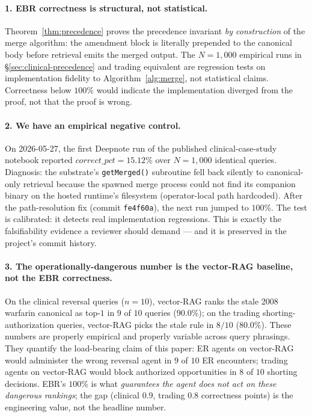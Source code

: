 \documentclass[runningheads]{llncs}
\begin{document}
\paragraph{1. EBR correctness is structural, not statistical.} Theorem~\ref{thm:precedence}
proves the precedence invariant \emph{by construction} of the merge
algorithm: the amendment block is literally prepended to the canonical
body before retrieval emits the merged output. The $N{=}1{,}000$ empirical
runs in \S\ref{sec:clinical-precedence} and trading equivalent are
regression tests on implementation fidelity to Algorithm~\ref{alg:merge},
not statistical claims. Correctness below $100\%$ would indicate the
implementation diverged from the proof, not that the proof is wrong.

\paragraph{2. We have an empirical negative control.} On 2026-05-27, the
first Deepnote run of the published clinical-case-study notebook reported
$\mathit{correct\_pct} = 15.12\%$ over $N{=}1{,}000$ identical queries.
Diagnosis: the substrate's \texttt{getMerged()} subroutine fell back
silently to canonical-only retrieval because the spawned merge process
could not find its companion binary on the hosted runtime's filesystem
(operator-local path hardcoded). After the path-resolution fix
(commit \texttt{fe4f60a}), the next run jumped to $100\%$. The test is
calibrated: it detects real implementation regressions. This is exactly
the falsifiability evidence a reviewer should demand --- and it is
preserved in the project's commit history.

\paragraph{3. The operationally-dangerous number is the vector-RAG
baseline, not the EBR correctness.} On the clinical reversal queries
($n{=}10$), vector-RAG ranks the stale 2008 warfarin canonical as top-$1$
in $9$ of $10$ queries ($90.0\%$); on the trading
shorting-authorization queries, vector-RAG picks the stale rule in
$8/10$ ($80.0\%$). These numbers are properly empirical and properly
variable across query phrasings. They quantify the load-bearing claim of
this paper: ER agents on vector-RAG would administer the wrong reversal
agent in $9$ of $10$ ER encounters; trading agents on vector-RAG would
block authorized opportunities in $8$ of $10$ shorting decisions. EBR's
$100\%$ is what \emph{guarantees the agent does not act on these
dangerous rankings}; the gap (clinical $0.9$, trading $0.8$ correctness
points) is the engineering value, not the headline number.
\end{document}
